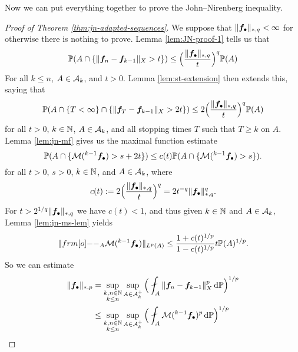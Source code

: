 Now we can put everything together to prove the John--Nirenberg inequality.

\begin{proof}[Proof of Theorem \ref{thm:jn-adapted-sequences}]
  We suppose that $\|\bm{f}_{\bullet}\|_{*,q} < \infty$ for otherwise there is nothing to prove.
  Lemma \ref{lem:JN-proof-1} tells us that
  \begin{equation}\label{eq:JN-proof-1-est-end}
    \mathbb{P}(A \cap \{ \|\bm{f}_n - \bm{f}_{k-1}\|_{X} > t \}) \leq \Big( \frac{\|\bm{f}_{\bullet}\|_{*,q}}{t} \Big)^{q} \mathbb{P}(A)
  \end{equation}
  For all $k \leq n$, $A \in \mathcal{A}_k$, and $t > 0$.
  Lemma \ref{lem:st-extension} then extends this, saying that
  \begin{equation}\label{eq:jn-stoptime-end}
    \mathbb{P}(A \cap \{T < \infty\} \cap \{ \| \bm{f}_{T} - \bm{f}_{k-1} \|_{X} > 2t \} ) \leq 2\Big( \frac{\|\bm{f}_{\bullet}\|_{*,q}}{t} \Big)^{q} \mathbb{P}(A)
  \end{equation}
  for all $t > 0$, $k \in \mathbb{N}$, $A \in \mathcal{A}_k$, and all stopping times $T$ such that $T \geq k$ on $A$.
  Lemma \ref{lem:jn-mf} gives us the maximal function estimate
  \begin{equation}\label{eq:jn-mf-eq-end}
    \mathbb{P}(A \cap \{ \mathcal{M}({}^{k-1} \bm{f}_{\bullet}) > s + 2t \}) \leq c(t) \mathbb{P}(A \cap \{  \mathcal{M}({}^{k-1} \bm{f}_{\bullet}) > s \}).
  \end{equation}
  for all $t > 0$, $s > 0$, $k \in \mathbb{N}$, and $A \in \mathcal{A}_{k}$, where
  \begin{equation*}
    c(t) := 2\Big( \frac{\|\bm{f}_{\bullet}\|_{*,q}}{t} \Big)^{q} = 2t^{-q} \|\bm{f}_{\bullet}\|_{*,q}^{q}.
  \end{equation*}
  For $t > 2^{1/q} \|\bm{f}_{\bullet}\|_{*,q}$  we have $c(t) < 1$, and thus given $k \in \mathbb{N}$ and $A \in \mathcal{A}_{k}$, Lemma \ref{lem:jn-ms-lem} yields
  \begin{equation*}
    \|\1_{A} \mc{M}({}^{k-1} \mb{f}_{\bullet})\|_{L^p(A)} \leq \frac{1 + c(t)^{1/p}}{1 - c(t)^{1/p}} t \P(A)^{1/p}.
  \end{equation*}
  So we can estimate
  \begin{equation*}
    \begin{aligned}
      \|\mb{f}_{\bullet}\|_{*,p}
      &= \sup_{\substack{k,n \in \N \\ k \leq n}} \sup_{A \in \mc{A}_{k}^{+}} \Big( \fint_{A} \|\mb{f}_{n} - \mb{f}_{k-1} \|_{X}^{p} \, \dd\P \Big)^{1/p} \\
      &\leq \sup_{\substack{k,n \in \N \\ k \leq n}} \sup_{A \in \mc{A}_{k}^{+}} \Big( \fint_{A} \mc{M}({}^{k-1}\mb{f}_{\bullet})^{p} \, \dd\P \Big)^{1/p} \\

\end{aligned}
\end{equation*}
\end{proof}
